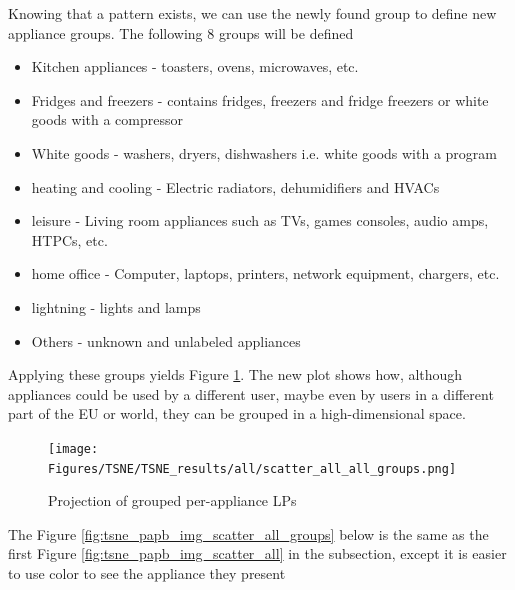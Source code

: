Knowing that a pattern exists, we can use the newly found group to define new appliance groups.
The following 8 groups will be defined
\begin{itemize}
    \item Kitchen appliances - toasters, ovens, microwaves, etc.
    \item Fridges and freezers  - contains fridges, freezers and fridge freezers or white goods with a compressor
    \item White goods - washers, dryers, dishwashers i.e. white goods with a program
    \item heating and cooling - Electric radiators, dehumidifiers and HVACs
    \item leisure -  Living room appliances such as TVs, games consoles, audio amps, HTPCs, etc.
    \item home office - Computer, laptops, printers, network equipment, chargers, etc.
    \item lightning - lights and lamps
    \item Others - unknown and unlabeled appliances
\end{itemize}

Applying these groups yields Figure \ref{fig:tsne_papb_scatter_all_groups}.
The new plot shows how, although appliances could be used by a different
user, maybe even by users in a different part of the EU or world,
they can be grouped in a high-dimensional space. 

\begin{figure}[H]
	\centering
	\caption{Projection of grouped per-appliance LPs}
	\texttt{[image: Figures/TSNE/TSNE\_results/all/scatter\_all\_all\_groups.png]}
	\label{fig:tsne_papb_scatter_all_groups}
\end{figure}

The Figure \ref{fig:tsne_papb_img_scatter_all_groups} below is the same as the first Figure \ref{fig:tsne_papb_img_scatter_all} in the subsection,
except it is easier to use color to see the appliance they present

